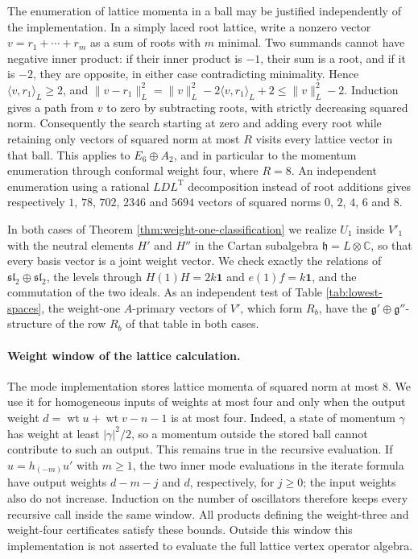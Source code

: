 \documentclass[leqno]{article}
\newcommand{\Cbb}{\ensuremath{\mathbb{C}}}
\renewcommand{\leq}{\ensuremath{\leqslant}}
\renewcommand{\geq}{\ensuremath{\geqslant}}
\newcommand{\ot}{\otimes}
\numberwithin{equation}{section}
\begin{document}
The enumeration of lattice momenta in a ball may be justified independently of the implementation. In a simply laced root lattice, write a nonzero vector $v = r_1+\cdots+r_m$ as a sum of roots with $m$ minimal. Two summands cannot have negative inner product: if their inner product is $-1$, their sum is a root, and if it is $-2$, they are opposite, in either case contradicting minimality. Hence $\langle v,r_1\rangle_L \geq 2$, and $\|v-r_1\|_L^2 = \|v\|_L^2-2\langle v,r_1\rangle_L+2 \leq \|v\|_L^2-2$. Induction gives a path from $v$ to zero by subtracting roots, with strictly decreasing squared norm. Consequently the search starting at zero and adding every root while retaining only vectors of squared norm at most $R$ visits every lattice vector in that ball. This applies to $E_6 \oplus A_2$, and in particular to the momentum enumeration through conformal weight four, where $R = 8$. An independent enumeration using a rational $LDL^{\mathrm T}$ decomposition instead of root additions gives respectively $1$, $78$, $702$, $2346$ and $5694$ vectors of squared norms $0$, $2$, $4$, $6$ and $8$.

In both cases of Theorem \ref{thm:weight-one-classification} we realize $U_1$ inside $V'_1$ with the neutral elements $H'$ and $H''$ in the Cartan subalgebra $\mathfrak h = L \ot \Cbb$, so that every basis vector is a joint weight vector. We check exactly the relations of $\mathfrak{sl}_2 \oplus \mathfrak{sl}_2$, the levels through $H(1)H = 2k\mathbf 1$ and $e(1)f = k\mathbf 1$, and the commutation of the two ideals. As an independent test of Table \ref{tab:lowest-spaces}, the weight-one $A$-primary vectors of $V'$, which form $R_b$, have the $\mathfrak g' \oplus \mathfrak g''$-structure of the row $R_b$ of that table in both cases.

\paragraph{Weight window of the lattice calculation.}\label{par:lattice-weight-window}
The mode implementation stores lattice momenta of squared norm at most $8$. We use it for homogeneous inputs of weights at most four and only when the output weight $d = \operatorname{wt}u+\operatorname{wt}v-n-1$ is at most four. Indeed, a state of momentum $\gamma$ has weight at least $|\gamma|^2/2$, so a momentum outside the stored ball cannot contribute to such an output. This remains true in the recursive evaluation. If $u = h_{(-m)}u'$ with $m \geq 1$, the two inner mode evaluations in the iterate formula have output weights $d-m-j$ and $d$, respectively, for $j \geq 0$; the input weights also do not increase. Induction on the number of oscillators therefore keeps every recursive call inside the same window. All products defining the weight-three and weight-four certificates satisfy these bounds. Outside this window this implementation is not asserted to evaluate the full lattice vertex operator algebra.
\end{document}

